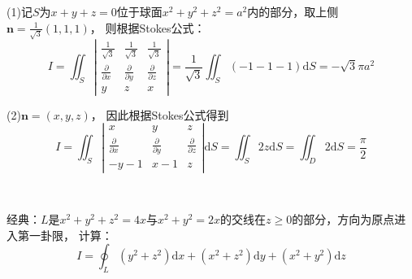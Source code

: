 \begin{solution}
  (1)记$S$为$x+y+z = 0$位于球面$x^2 + y^2 + z^2 = a^2$内的部分，取上侧$\mathbf{n} = \frac{1}{\sqrt{3}}(1,1,1)$，
  则根据Stokes公式：
  \begin{equation*}
    I = \iint_S \left|
      \begin{array}{ccc}
        \frac{1}{\sqrt{3}}&\frac{1}{\sqrt{3}}&\frac{1}{\sqrt{3}} \\
                          \frac{\partial}{\partial x}&\frac{\partial }{\partial y}&\frac{\partial}{\partial z} \\
                          y&z&x
      \end{array}
    \right| = \frac{1}{\sqrt{3}}\iint_S (-1-1-1)\mathrm{d} S = - \sqrt{3}\pi a^2
  \end{equation*}

  (2)$\mathbf{n} = (x,y,z)$，
  因此根据Stokes公式得到
  \begin{equation*}
    I = \iint_S \left|
      \begin{array}{ccc}
        x&y&z \\
         \frac{\partial}{\partial x}&\frac{\partial}{\partial y}&\frac{\partial }{\partial z}\\
        -y-1&x-1&z
      \end{array}
    \right|\mathrm{d}S = \iint_S 2z \mathrm{d} S = \iint_D 2 \mathrm{d}S = \frac{\pi}{2}
  \end{equation*}
\end{solution}

~

\begin{exercise}[二次项Stokes公式]
  经典：$L$是$x^2 + y^2 + z^2 = 4x$与$x^2 + y^2 = 2x$的交线在$z \geq 0$的部分，方向为原点进入第一卦限，
  计算：
  \begin{equation*}
    I = \oint _L(y^2 + z^2)\mathrm{d} x + (x^2 + z^2)\mathrm{d} y + (x^2 + y^2)\mathrm{d}z
  \end{equation*}
\end{exercise}

